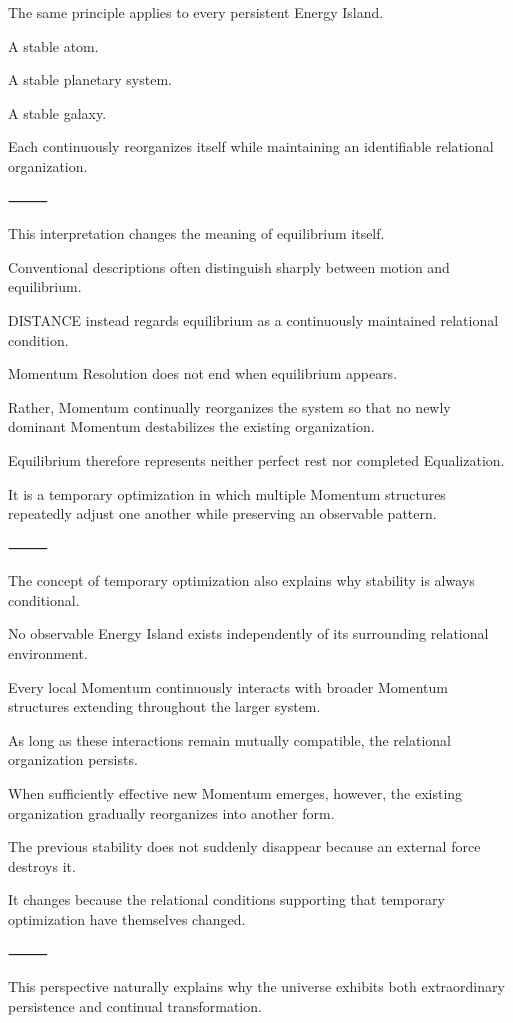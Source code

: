 The same principle applies to every persistent Energy Island.

A stable atom.

A stable planetary system.

A stable galaxy.

Each continuously reorganizes itself while maintaining an identifiable relational organization.

⸻

This interpretation changes the meaning of equilibrium itself.

Conventional descriptions often distinguish sharply between motion and equilibrium.

DISTANCE instead regards equilibrium as a continuously maintained relational condition.

Momentum Resolution does not end when equilibrium appears.

Rather, Momentum continually reorganizes the system so that no newly dominant Momentum destabilizes the existing organization.

Equilibrium therefore represents neither perfect rest nor completed Equalization.

It is a temporary optimization in which multiple Momentum structures repeatedly adjust one another while preserving an observable pattern.

⸻

The concept of temporary optimization also explains why stability is always conditional.

No observable Energy Island exists independently of its surrounding relational environment.

Every local Momentum continuously interacts with broader Momentum structures extending throughout the larger system.

As long as these interactions remain mutually compatible, the relational organization persists.

When sufficiently effective new Momentum emerges, however, the existing organization gradually reorganizes into another form.

The previous stability does not suddenly disappear because an external force destroys it.

It changes because the relational conditions supporting that temporary optimization have themselves changed.

⸻

This perspective naturally explains why the universe exhibits both extraordinary persistence and continual transformation.

